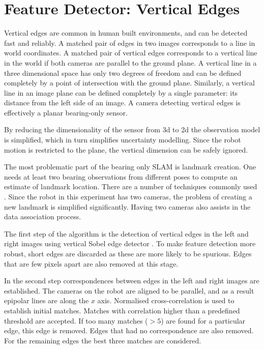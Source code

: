\section{Feature Detector: Vertical Edges}

Vertical edges are common in human built environments, and can be
detected fast and reliably. A matched pair of edges in two images
corresponds to a line in world coordinates. A matched pair of vertical
edges corresponds to a vertical line in the world if both
cameras are parallel to the ground plane. A vertical line in a three
dimensional space has only two degrees of freedom and can be defined
completely by a point of intersection with the ground plane. Similarly,
a vertical line in an image plane can be defined completely by a
single parameter: its distance from the left side of an image. A
camera detecting vertical edges is effectively a planar bearing-only
sensor.

By reducing the dimensionality of the sensor from 3d to 2d the
observation model is simplified, which in turn simplifies uncertainty
modelling. Since the robot motion is restricted to the plane, the
vertical dimension can be safely ignored.

The most problematic part of the bearing only SLAM is landmark
creation. One needs at least two bearing observations from different
poses to compute an estimate of landmark location. There are a
number of techniques commonly used \cite{bearing_only_slam}. Since the
robot in this experiment has two cameras, the problem of creating a
new landmark is simplified significantly. Having two cameras also
assists in the data association process. 

The first step of the algorithm is the detection of vertical edges in
the left and right images using vertical Sobel edge detector
\cite{Hartley2004}. To make feature detection more robust, short edges
are discarded as these are more likely to be spurious. Edges that are
few pixels apart are also removed at this stage.

In the second step correspondences between edges in the left and right
images are established. The cameras on the robot are aligned to be
parallel, and as a result epipolar lines are along the $x$
axis\cite{Hartley2004}. Normalised cross-correlation is used to
establish initial matches. Matches with correlation higher than a
predefined threshold are accepted. If too many matches ($>5$) are
found for a particular edge, this edge is removed. Edges that had no
correspondence are also removed. For the remaining edges the best
three matches are considered.

